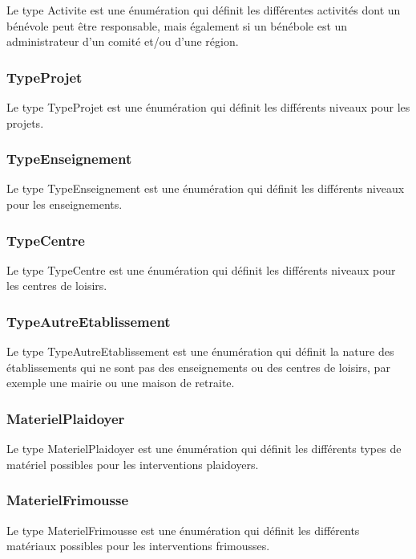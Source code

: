 Le type Activite est une énumération qui définit les différentes activités dont un bénévole peut être responsable, mais également si un bénébole est un administrateur d'un comité et/ou d'une région.

\subsubsection*{TypeProjet}

Le type TypeProjet est une énumération qui définit les différents niveaux pour les projets.

\subsubsection*{TypeEnseignement}

Le type TypeEnseignement est une énumération qui définit les différents niveaux pour les enseignements.

\subsubsection*{TypeCentre}

Le type TypeCentre est une énumération qui définit les différents niveaux pour les centres de loisirs.

\subsubsection*{TypeAutreEtablissement}

Le type TypeAutreEtablissement est une énumération qui définit la nature des établissements qui ne sont pas des enseignements ou des centres de loisirs, par exemple une mairie ou une maison de retraite.

\subsubsection*{MaterielPlaidoyer}

Le type MaterielPlaidoyer est une énumération qui définit les différents types de matériel possibles pour les interventions plaidoyers.

\subsubsection*{MaterielFrimousse}

Le type MaterielFrimousse est une énumération qui définit les différents matériaux possibles pour les interventions frimousses.


